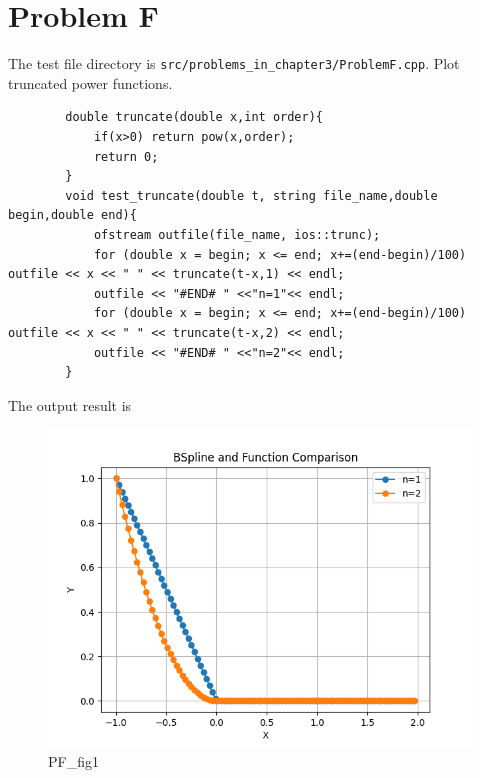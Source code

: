 \documentclass[a4paper]{article}
\begin{document}
\section*{Problem F}
    The test file directory is \texttt{src/problems\_in\_chapter3/ProblemF.cpp}.
    Plot truncated power functions.
    \begin{verbatim}
        double truncate(double x,int order){
            if(x>0) return pow(x,order);
            return 0;
        }
        void test_truncate(double t, string file_name,double begin,double end){
            ofstream outfile(file_name, ios::trunc);
            for (double x = begin; x <= end; x+=(end-begin)/100) outfile << x << " " << truncate(t-x,1) << endl;
            outfile << "#END# " <<"n=1"<< endl;
            for (double x = begin; x <= end; x+=(end-begin)/100) outfile << x << " " << truncate(t-x,2) << endl;
            outfile << "#END# " <<"n=2"<< endl;
        }
    \end{verbatim}
    The output result is
    \begin{figure}[H] 
        \centering
        \includegraphics{../figure/PF_fig1.png}
    \caption{PF\_fig1} 
    \end{figure}
\end{document}
